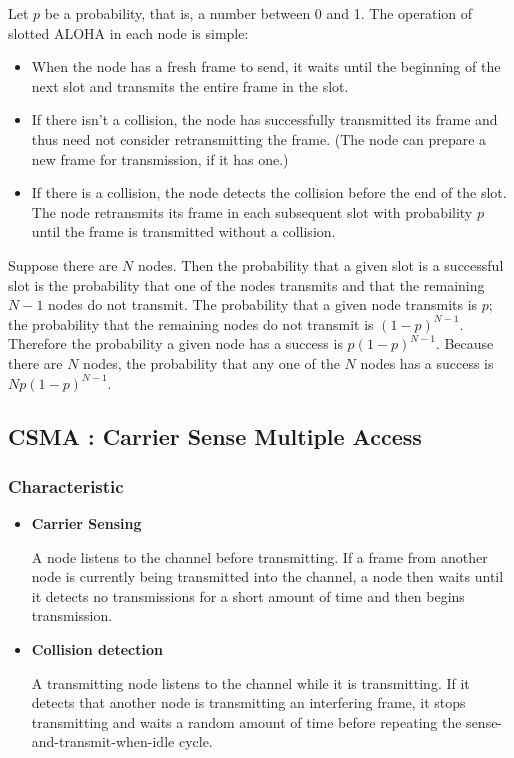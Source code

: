 \documentclass[11pt]{article}
\begin{document}
Let $p$ be a probability, that is, a number between 0 and 1. The operation of slotted ALOHA in each node is simple:

\begin{itemize}
	\item When the node has a fresh frame to send, it waits until the beginning of the next slot and transmits the entire frame in the slot.
	
	\item If there isn’t a collision, the node has successfully transmitted its frame and thus need not consider retransmitting the frame. (The node can prepare a new frame for transmission, if it has one.)
	
	\item If there is a collision, the node detects the collision before the end of the slot. The node retransmits its frame in each subsequent slot with probability $p$ until the frame is transmitted without a collision.

\end{itemize}

Suppose there are $N$ nodes. Then the probability that a given slot is a successful slot is the probability that one of the nodes transmits and that the remaining $N - 1$ nodes do not transmit. The probability that a given node transmits is $p$; the probability that the remaining nodes do not transmit is $(1 - p)^{N-1}$. Therefore the probability a given node has a success is $p(1 - p)^{N-1}$. Because there are $N$ nodes, the probability that any one of the $N$ nodes has a success is $Np(1 - p)^{N - 1}$.

\subsection{CSMA : Carrier Sense Multiple Access}

\subsubsection{Characteristic}

\begin{itemize}
	\item  \textbf{Carrier Sensing}
	
	A node listens to the channel before transmitting. If a frame from another node is currently being transmitted into the channel, a node then waits until it detects no transmissions for a short amount of time and then begins transmission.
	
	\item \textbf{Collision detection}
	
	A transmitting node listens to the channel while it is transmitting. If it detects that another node is transmitting an interfering frame, it stops transmitting and waits a random amount of time before repeating the sense-and-transmit-when-idle cycle.
	
\end{itemize}
\end{document}
